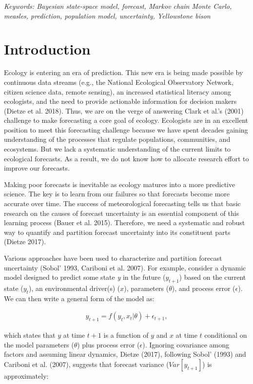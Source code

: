 \documentclass[12pt,]{article}
\begin{document}
\emph{Keywords: Bayesian state-space model, forecast, Markov chain Monte
Carlo, measles, prediction, population model, uncertainty, Yellowstone
bison}

\hypertarget{introduction}{%
\section{Introduction}\label{introduction}}

Ecology is entering an era of prediction. This new era is being made
possible by continuous data streams (e.g., the National Ecological
Observatory Network, citizen science data, remote sensing), an increased
statistical literacy among ecologists, and the need to provide
actionable information for decision makers (Dietze et al. 2018). Thus,
we are on the verge of answering Clark et al.'s (2001) challenge to make
forecasting a core goal of ecology. Ecologists are in an excellent
position to meet this forecasting challenge because we have spent
decades gaining understanding of the processes that regulate
populations, communities, and ecosystems. But we lack a systematic
understanding of the current limits to ecological forecasts. As a
result, we do not know how to allocate research effort to improve our
forecasts.

Making poor forecasts is inevitable as ecology matures into a more
predictive science. The key is to learn from our failures so that
forecasts become more accurate over time. The success of meteorological
forecasting tells us that basic research on the causes of forecast
uncertainty is an essential component of this learning process (Bauer et
al. 2015). Therefore, we need a systematic and robust way to quantify
and partition forecast uncertainty into its constituent parts (Dietze
2017).

Various approaches have been used to characterize and partition forecast
uncertainty (Sobol' 1993, Cariboni et al. 2007). For example, consider a
dynamic model designed to predict some state \emph{y} in the future
(\(y_{t+1}\)) based on the current state (\(y_{t}\)), an environmental
driver(s) (\(x\)), parameters (\(\theta\)), and process error
(\(\epsilon\)). We can then write a general form of the model as:

\begin{align}
y_{t+1} = f(y_t, x_t|\theta) + \epsilon_{t+1},
\end{align}

\noindent{}which states that \(y\) at time \(t+1\) is a function of
\(y\) and \(x\) at time \(t\) conditional on the model parameters
(\(\theta\)) plus process error (\(\epsilon\)). Ignoring covariance
among factors and assuming linear dynamics, Dietze (2017), following
Sobol' (1993) and Cariboni et al. (2007), suggests that forecast
variance (\(Var[y_{t+1}]\)) is approximately:
\end{document}
